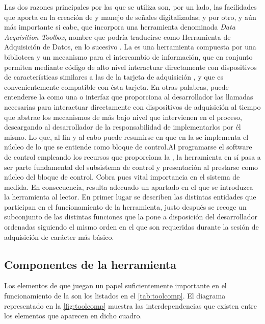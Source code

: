 Las dos razones principales por las que se utiliza \matlab{} son, por un
lado, las facilidades que aporta en la creación de \gui{} y manejo de
señales digitalizadas; y por otro, y aún más importante si cabe, que
incorpora una herramienta denominada \emph{Data Acquisition Toolbox},
nombre que podría traducirse como Herramienta de Adquisición de Datos, en
lo sucesivo . La \datx{} es una herramienta compuesta por una
biblioteca y un mecanismo para el intercambio de información, que en
conjunto permiten mediante código de alto nivel interactuar directamente
con dispositivos de características similares a las de la tarjeta de
adquisición \kpci{}, y que es convenientemente compatible con ésta tarjeta.
En otras palabras, puede entenderse la \datx{} como una  o
interfaz que proporciona al desarrollador las llamadas necesarias para
interactuar directamente con dispositivos de adquisición al tiempo que
abstrae los mecanismos de más bajo nivel que intervienen en el proceso,
descargando al desarrollador de la responsabilidad de implementarlos por él
mismo. Lo que, al fin y al cabo puede resumirse en que en la \datx{} se
implementa el núcleo de lo que se entiende como bloque de control.Al
programarse el software de control empleando los recursos que proporciona
la \datx{}, la herramienta en sí pasa a ser parte fundamental del
subsistema de control y presentación al prestarse como núcleo del bloque de
control. Cobra pues vital importancia en el sistema de medida. En
consecuencia, resulta adecuado un apartado en el que se introduzca la
herramienta al lector. En primer lugar se describen las distintas entidades
que participan en el funcionamiento de la herramienta, justo después se
recoge un subconjunto de las distintas funciones que la \datx{} pone a
disposición del desarrollador ordenadas siguiendo el mismo orden en el que
son requeridas durante la sesión de adquisición de carácter más básico.


\subsection{Componentes de la herramienta}

Los elementos de \matlab{} que juegan un papel suficientemente importante
en el funcionamiento de la \datx{} son los listados en el
\cref{tab:toolcomp}. El diagrama representado en la \vref{fig:toolcomp}
muestra las interdependencias que existen entre los elementos que aparecen
en dicho cuadro.

